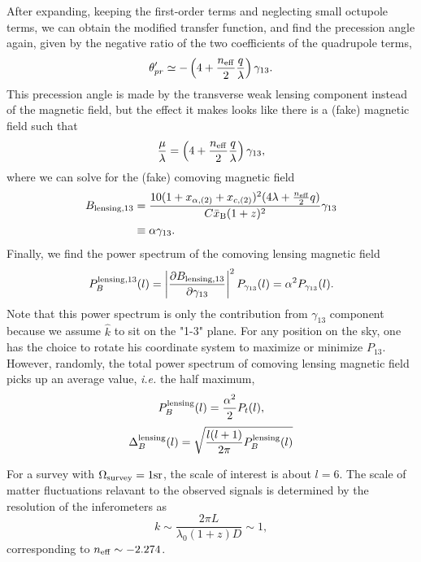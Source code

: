 \documentclass[aps,prd,twocolumn,floatfix,showpacs,superscriptaddress,nofootinbib]{revtex4-1}
\newcommand{\ie}{{\it i.e. }}
\begin{document}
After expanding, keeping the first-order terms and neglecting small octupole terms, we can obtain the modified transfer function, and find the precession angle again, given by the negative ratio of the two coefficients of the quadrupole terms,
\begin{equation}
\theta_{pr}'\simeq-\left(4+\frac{n_{\rm eff}}{2}\frac{q}{\lambda}\right)\gamma_{13}.
\end{equation}
This precession angle is made by the transverse weak lensing component instead of the magnetic field, but the effect it makes looks like there is a (fake) magnetic field such that
\begin{equation}
\frac{\mu}{\lambda}=\left(4+\frac{n_{\rm eff}}{2}\frac{q}{\lambda}\right)\gamma_{13},
\end{equation}
where we can solve for the (fake) comoving magnetic field
\begin{align}
B_{\rm lensing,13}&=\frac{10(1+x_{\alpha,(2)}+x_{c,(2)})^2(4\lambda+\frac{n_{\rm eff}}{2}q)}{C\bar{x}_{\rm B}(1+z)^2}\gamma_{13}\nonumber\\
&\equiv\alpha\gamma_{13}.
\end{align}
Finally, we find the power spectrum of the comoving lensing magnetic field
\begin{equation}
P_B^{\rm lensing,13}(l)=\left\vert\frac{\partial B_{\rm lensing,13}}{\partial\gamma_{13}}\right\vert^2 P_{\gamma_{13}}(l)=\alpha^2 P_{\gamma_{13}}(l).
\end{equation}
Note that this power spectrum is only the contribution from $\gamma_{13}$ component because we assume $\hat{k}$ to sit on the "1-3" plane. For any position on the sky, one has the choice to rotate his coordinate system to maximize or minimize $P_{13}$. However, randomly, the total power spectrum of comoving lensing magnetic field picks up an average value, \ie the half maximum,
\begin{equation}
P_B^{\rm lensing}(l)=\frac{\alpha^2}{2} P_t(l),
\end{equation}
\begin{equation}
\Delta_{B}^{\rm lensing}(l)=\sqrt{\frac{l(l+1)}{2\pi}P_B^{\rm lensing}(l)}
\end{equation}

For a survey with $\Omega_{\rm survey}=1{\rm sr}$, the scale of interest is about $l=6$. The scale of matter fluctuations relavant to the observed signals is determined by the resolution of the inferometers as
\begin{equation}
k\sim \frac{2\pi L}{\lambda_0(1+z)D}\sim 1,
\end{equation}
corresponding to $n_{\rm eff}\sim -2.274$.
\end{document}
